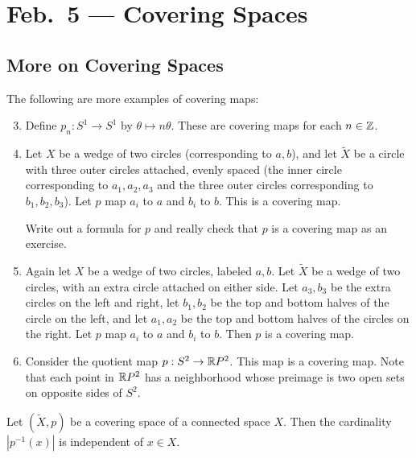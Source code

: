 \chapter{Feb.~5 --- Covering Spaces}

\section{More on Covering Spaces}

\begin{example}\label{example:covering}
  The following are more examples of covering maps:
  \begin{enumerate}
    \setcounter{enumi}{2}
    \item Define $p_n : S^1 \to S^1$ by
      $\theta \mapsto n \theta$.
      These are covering maps for each $n \in \mathbb{Z}$.
    \item Let $X$ be a wedge of two circles
      (corresponding to $a, b$), and
      let $\widetilde{X}$ be a circle with
      three outer circles attached, evenly spaced (the inner
      circle corresponding to $a_1, a_2, a_3$ and
      the three outer circles corresponding to
      $b_1, b_2, b_3$). Let $p$ map
      $a_i$ to $a$ and $b_i$ to $b$. This is a covering
      map.

      Write out a formula for $p$ and really check that
      $p$ is a covering map as an exercise.
    \item Again let $X$ be a wedge of two circles,
      labeled $a, b$. Let $\widetilde{X}$ be a wedge of
      two circles, with an extra circle attached on
      either side. Let $a_3, b_3$ be the extra circles
      on the left and right, let $b_1, b_2$ be
      the top and bottom halves of the circle on the
      left, and let $a_1, a_2$ be the top and bottom
      halves of the circles on the right. Let
      $p$ map $a_i$ to $a$ and $b_i$ to $b$. Then
      $p$ is a covering map.
    \item Consider the quotient map
      $p : S^2 \to \mathbb{R} P^2$.
      This map is a covering map.
      Note that each point
      in $\mathbb{R} P^2$ has a neighborhood whose preimage
      is two open sets on opposite sides of $S^2$.
  \end{enumerate}
\end{example}

\begin{lemma}
  Let $(\widetilde{X}, p)$ be a covering space of a
  connected space $X$. Then the cardinality
  $|p^{-1}(x)|$ is independent of $x \in X$.
\end{lemma}


